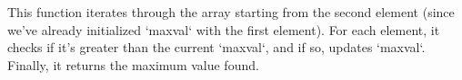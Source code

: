 \documentclass[preview]{standalone}
\begin{document}
This function iterates through the array starting from the second element (since we've already initialized `maxval` with the first element). For each element, it checks if it's greater than the current `maxval`, and if so, updates `maxval`. Finally, it returns the maximum value found.\\
\end{document}
